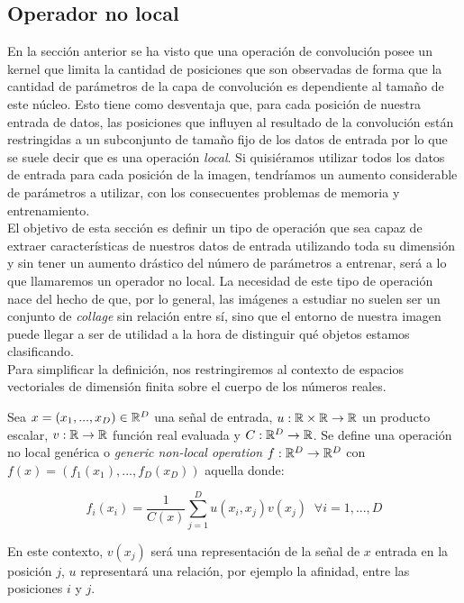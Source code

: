 \begin{itemize}
\chapter{Operador no local}\label{def:non-local}
En la sección anterior se ha visto que una operación de convolución posee un kernel que limita la cantidad de posiciones que son observadas de forma que la cantidad de parámetros de la capa de convolución es dependiente al tamaño de este núcleo. Esto tiene como desventaja que, para cada posición de nuestra entrada de datos, las posiciones que influyen al resultado de la convolución están restringidas a un subconjunto de tamaño fijo de los datos de entrada por lo que se suele decir que es una operación \emph{local}. Si quisiéramos utilizar todos los datos de entrada para cada posición de la imagen, tendríamos un aumento considerable de parámetros a utilizar, con los consecuentes problemas de memoria y entrenamiento.\\

El objetivo de esta sección es definir un tipo de operación que sea capaz de extraer características de nuestros datos de entrada utilizando toda su dimensión y sin tener un aumento drástico del número de parámetros a entrenar, será a lo que llamaremos un operador no local. La necesidad de este tipo de operación nace del hecho de que, por lo general, las imágenes a estudiar no suelen ser un conjunto de \emph{collage} sin relación entre sí, sino que el entorno de nuestra imagen puede llegar a ser de utilidad a la hora de distinguir qué objetos estamos clasificando.\\

Para simplificar la definición, nos restringiremos al contexto de espacios vectoriales de dimensión finita sobre el cuerpo de los números reales.
\begin{definicion}
 Sea $x=(x_1,...,x_D)\in \mathbb{R}^D$ una señal de entrada, $u:\mathbb{R} \times \mathbb{R} \to \mathbb{R}$ un producto escalar, $v:\mathbb{R} \to \mathbb{R}$ función real evaluada y $C:\mathbb{R}^D \to \mathbb{R}$.  Se define una operación no local genérica o \emph{generic non-local operation} $f:\mathbb{R}^D \to \mathbb{R}^D$ con $f(x)=(f_1(x_1),...,f_D(x_D))$ aquella donde:

 $$f_i(x_i)=\frac{1}{C(x)}\sum_{j=1}^{D} u(x_i,x_j)v(x_j) \; \;  \forall i=1,...,D$$
\end{definicion}

 En este contexto, $v(x_j)$ será una representación de la señal de $x$ entrada en la posición $j$, $u$ representará una relación, por ejemplo la afinidad, entre las posiciones $i$ y $j$. %
\newline


\end{itemize}
